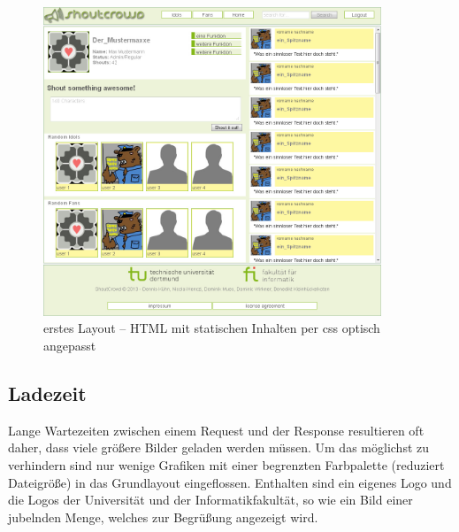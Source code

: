 \documentclass[12pt,a4paper]{article}
\begin{document}
\begin{figure}[h!]
\begin{center}
\includegraphics[width=0.9\textwidth]{first.jpg}
\caption{erstes Layout -- HTML mit statischen Inhalten per css optisch angepasst}
\end{center}
\end{figure}

\subsection{Ladezeit}
Lange Wartezeiten zwischen einem Request und der Response resultieren oft daher, dass viele größere Bilder geladen werden müssen. Um das möglichst zu verhindern sind nur wenige Grafiken mit einer begrenzten Farbpalette (reduziert Dateigröße) in das Grundlayout eingeflossen. Enthalten sind ein eigenes Logo und die Logos der Universität und der Informatikfakultät, so wie ein Bild einer jubelnden Menge, welches zur Begrüßung angezeigt wird.
\end{document}
